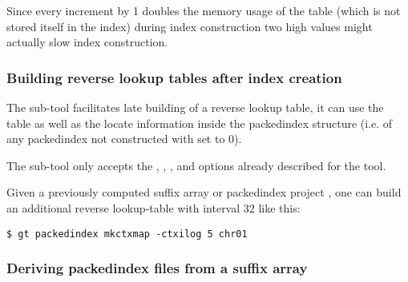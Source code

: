 \documentclass[12pt,titlepage]{article}
\begin{document}
\begin{Justshowoptions}
{Since every increment by 1 doubles the memory usage of the table
(which is not stored itself in the index) during index construction
two high values might actually slow index construction.
}

\end{Justshowoptions}

\subsubsection{Building reverse lookup tables after index creation}
\label{sec:packedindex:mkctxmap}

The  sub-tool facilitates late building of a
reverse lookup table, it can use the  table as
well as the locate information inside the packedindex structure
(i.e. of any packedindex not constructed with  set
to 0).

The  sub-tool only accepts the
, , , and
 options already described for the
 tool.

Given a previously computed suffix array or packedindex project
, one can build an additional reverse lookup-table with
interval 32 like this:
\begin{footnotesize}
\begin{verbatim}
$ gt packedindex mkctxmap -ctxilog 5 chr01
\end{verbatim}
\end{footnotesize}

\subsubsection{Deriving packedindex files from a suffix array}
\label{sec:packedindex:trsuftab}
\end{document}
